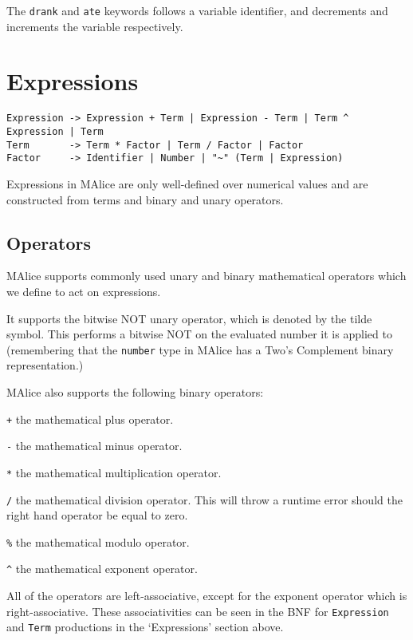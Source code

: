 \documentclass[a4wide, 11pt]{article}
\begin{document}
The \texttt{drank} and \texttt{ate} keywords follows a variable identifier, and decrements and increments the variable respectively.
  
\section{Expressions}

\begin{verbatim}
Expression -> Expression + Term | Expression - Term | Term ^ Expression | Term
Term       -> Term * Factor | Term / Factor | Factor
Factor     -> Identifier | Number | "~" (Term | Expression)

\end{verbatim}

Expressions in MAlice are only well-defined over numerical values and are constructed from terms and binary and unary operators.

\subsection{Operators}

MAlice supports commonly used unary and binary mathematical operators which we define to act on expressions.

It supports the bitwise NOT unary operator, which is denoted by the tilde symbol. This performs a bitwise NOT on the evaluated number it is applied to (remembering that the \texttt{number} type in MAlice has a Two's Complement binary representation.)

MAlice also supports the following binary operators:

\begin{list}{} {
\setlength{\labelsep}{0.75cm}
\setlength{\leftmargin}{2cm}
}

\item[\texttt{+}] the mathematical plus operator.
\item[\texttt{-}] the mathematical minus operator.
\item[\texttt{*}] the mathematical multiplication operator.
\item[\texttt{/}] the mathematical division operator. This will throw a runtime error should the right hand operator be equal to zero.
\item[\texttt{\%}] the mathematical modulo operator.
\item[\texttt{\^}] the mathematical exponent operator.

\end{list}

All of the operators are left-associative, except for the exponent operator which is right-associative. These associativities can be seen in the BNF for \texttt{Expression} and \texttt{Term} productions in the `Expressions' section above.
\end{document}
